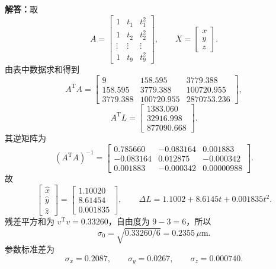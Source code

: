 \documentclass[UTF8,zihao=-4]{ctexart}
\newcommand{\jieda}{\noindent\textbf{解答：}}
\begin{document}
{\jieda 取
\begin{equation*}
    A=\begin{bmatrix}
        1&t_1&t_1^2\\
        1&t_2&t_2^2\\
        \vdots&\vdots&\vdots\\
        1&t_9&t_9^2
    \end{bmatrix},
    \qquad
    X=\begin{bmatrix}x\\y\\z\end{bmatrix}.
\end{equation*}
由表中数据求和得到
\begin{equation*}
    A^{\mathrm T}A=\begin{bmatrix}
        9&158.595&3779.388\\
        158.595&3779.388&100720.955\\
        3779.388&100720.955&2870753.236
    \end{bmatrix},
\end{equation*}
\begin{equation*}
    A^{\mathrm T}L=\begin{bmatrix}
        1383.060\\32916.998\\877090.668
    \end{bmatrix}.
\end{equation*}
其逆矩阵为
\begin{equation*}
    (A^{\mathrm T}A)^{-1}=\begin{bmatrix}
        0.785660&-0.083164&0.001883\\
        -0.083164&0.012875&-0.000342\\
        0.001883&-0.000342&0.00000988
    \end{bmatrix}.
\end{equation*}
故
\begin{equation*}
    \begin{bmatrix}\hat{x}\\\hat{y}\\\hat{z}\end{bmatrix}
    =\begin{bmatrix}
        1.10020\\8.61454\\0.001835
    \end{bmatrix},
    \qquad
    \Delta L=1.1002+8.6145t+0.001835t^2.
\end{equation*}
残差平方和为 $v^{\mathrm T}v=0.33260$，自由度为 $9-3=6$，所以
\begin{equation*}
    \sigma_0=\sqrt{0.33260/6}=0.2355\,\mu\mathrm{m}.
\end{equation*}
参数标准差为
\begin{equation*}
    \sigma_x=0.2087,
    \qquad
    \sigma_y=0.0267,
    \qquad
    \sigma_z=0.000740.
\end{equation*}

}
\end{document}
